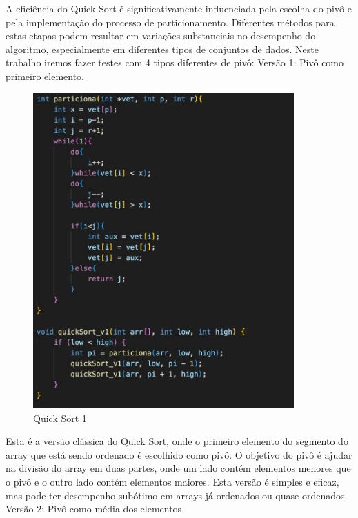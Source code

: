 A eficiência do Quick Sort é significativamente influenciada pela escolha do pivô e pela implementação do processo de particionamento. Diferentes métodos para estas etapas podem resultar em variações substanciais no desempenho do algoritmo, especialmente em diferentes tipos de conjuntos de dados. Neste trabalho iremos fazer testes com 4 tipos diferentes de pivô: 
Versão 1: Pivô como primeiro elemento.
\begin{figure}[H]
    \centering
    \includegraphics[width = 10cm]{Imagens/Quick Sort/quick1.jpeg}
    \caption{Quick Sort 1}
    \label{grafico_insert}
\end{figure}
Esta é a versão clássica do Quick Sort, onde o primeiro elemento do segmento do array que está sendo ordenado é escolhido como pivô. O objetivo do pivô é ajudar na divisão do array em duas partes, onde um lado contém elementos menores que o pivô e o outro lado contém elementos maiores. Esta versão é simples e eficaz, mas pode ter desempenho subótimo em arrays já ordenados ou quase ordenados.
Versão 2: Pivô como média dos elementos.
